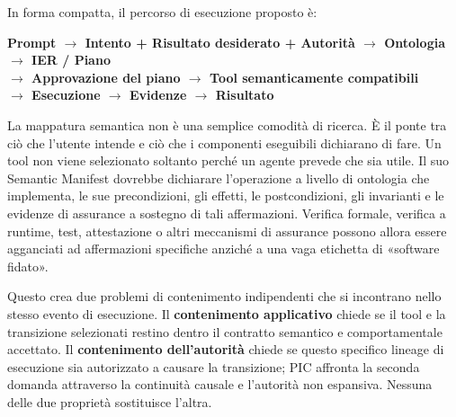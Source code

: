 \documentclass[10pt,oneside,openany]{book}
\newcommand{\term}[1]{\textbf{#1}}
\begin{document}
\begin{center}
{}
\end{center}

In forma compatta, il percorso di esecuzione proposto è:

\begin{center}
\sffamily\bfseries\footnotesize
Prompt $\rightarrow$ Intento + Risultato desiderato + Autorità $\rightarrow$ Ontologia $\rightarrow$ IER / Piano\\
$\rightarrow$ Approvazione del piano $\rightarrow$ Tool semanticamente compatibili\\
$\rightarrow$ Esecuzione $\rightarrow$ Evidenze $\rightarrow$ Risultato
\end{center}

La mappatura semantica non è una semplice comodità di ricerca. È il ponte tra ciò che l'utente intende e ciò che i componenti eseguibili dichiarano di fare. Un tool non viene selezionato soltanto perché un agente prevede che sia utile. Il suo Semantic Manifest dovrebbe dichiarare l'operazione a livello di ontologia che implementa, le sue precondizioni, gli effetti, le postcondizioni, gli invarianti e le evidenze di assurance a sostegno di tali affermazioni. Verifica formale, verifica a runtime, test, attestazione o altri meccanismi di assurance possono allora essere agganciati ad affermazioni specifiche anziché a una vaga etichetta di «software fidato».

Questo crea due problemi di contenimento indipendenti che si incontrano nello stesso evento di esecuzione. Il \term{contenimento applicativo} chiede se il tool e la transizione selezionati restino dentro il contratto semantico e comportamentale accettato. Il \term{contenimento dell'autorità} chiede se questo specifico lineage di esecuzione sia autorizzato a causare la transizione; PIC affronta la seconda domanda attraverso la continuità causale e l'autorità non espansiva. Nessuna delle due proprietà sostituisce l'altra.
\end{document}
